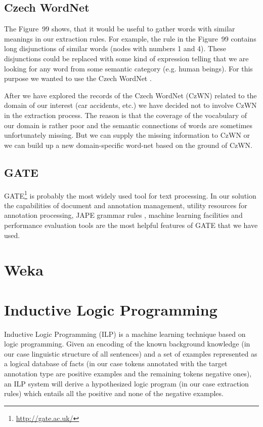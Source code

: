 
\subsection{Czech WordNet}

The Figure~99 shows, that it would be useful to gather words with similar meanings in our extraction rules. For example, the rule in the Figure~99 contains long disjunctions of similar words (nodes with numbers 1 and 4). These disjunctions could be replaced with some kind of expression telling that we are looking for any word from some semantic category (e.g. human beings). For this purpose we wanted to use the Czech WordNet \citep{biblio:WordNetCZ2004}. 

After we have explored the records of the Czech WordNet (CzWN) related to the domain of our interest (car accidents, etc.) we have decided not to involve CzWN in the extraction process. The reason is that the coverage of the vocabulary of our domain is rather poor and the semantic connections of words are sometimes unfortunately missing. But we can supply the missing information to CzWN or we can build up a new domain-specific word-net based on the ground of CzWN.  



\subsection{GATE}
GATE\footnote{\url{http://gate.ac.uk/}} \citep{dedek:GATE_ACL2002} is probably the most widely used tool for text processing. In our solution the capabilities of document and annotation management, utility resources for annotation processing, JAPE grammar rules \citep{Cunningham00jape:a}, machine learning facilities and performance evaluation tools are the most helpful features of GATE that we have used.



\section{Weka}


\section{Inductive Logic Programming}
Inductive Logic Programming (ILP) \citep{dedek:MuggletonILP} is a machine learning technique based on logic programming. Given an encoding of the known background knowledge (in our case linguistic structure of all sentences) and a set of examples represented as a logical database of facts (in our case tokens annotated with the target annotation type are positive examples and the remaining tokens negative ones), an ILP system will derive a hypothesized logic program (in our case extraction rules) which entails all the positive and none of the negative examples.

